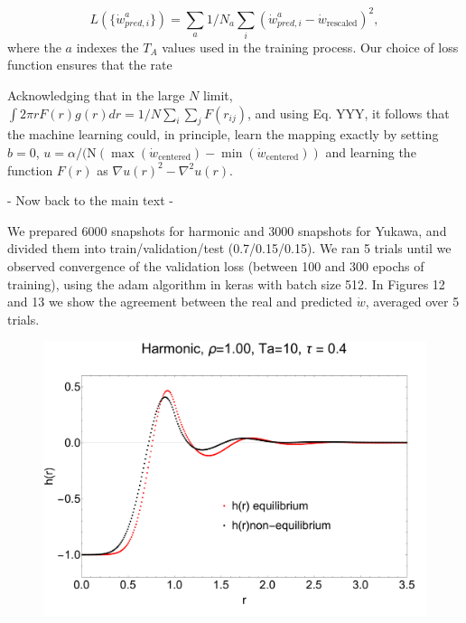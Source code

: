 \documentclass[amsmath,preprintnumbers,10pt,nofootinbib,prl,twocolumn]{revtex4-1}
\begin{document}
\begin{equation}
     L(\{\dot{w}^a_{pred, i}\}) = \sum_a 1/N_a \sum_i (\dot{w}^a_{pred, i} - \dot{w}_{\text{rescaled}})^2,
\end{equation}
where the $a$ indexes the $T_A$ values used in the training process.  Our choice of loss function ensures that the rate

Acknowledging that in the large $N$ limit, $ \int 2\pi r F(r) g(r) dr = 1/N \sum_i \sum_j F(r_{ij})$, and using Eq. YYY, it follows that the machine learning could, in principle, learn the mapping exactly by setting $b = 0$, $ u = \alpha/(\text{N} (\max(\dot{w}_{\text{centered}}) - \min(\dot{w}_{\text{centered}} ))$ and learning the function $F(r)$ as $\nabla u(r)^2 - \nabla^2 u(r)$.

- Now back to the main text - 

We prepared 6000 snapshots for harmonic and 3000 snapshots for Yukawa, and divided them into train/validation/test (0.7/0.15/0.15). We ran 5 trials until we observed convergence of the validation loss (between 100 and 300 epochs of training), using the adam algorithm in keras with batch size 512. In Figures 12 and 13 we show the agreement between the real and predicted $\dot{w}$, averaged over 5 trials. 


\begin{figure}
    \centering
    \includegraphics[scale=0.25, clip=True]{HarmonicA16_p1.0_Ta10_U0.40.pdf}
    \caption{}
    \label{Fig:n}
\end{figure}
\end{document}
